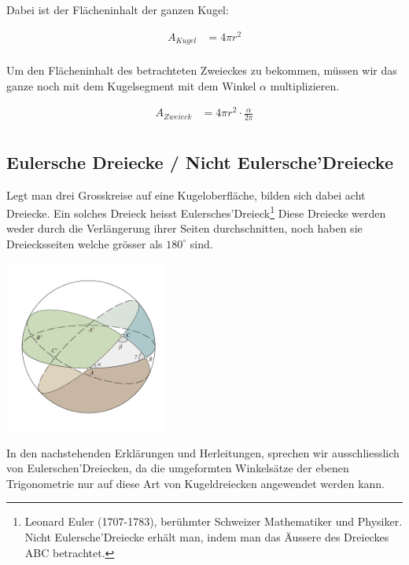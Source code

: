 \begin{refsection}
Dabei ist der Flächeninhalt der ganzen Kugel:

\begin{align*}
A_{ Kugel } &= 4 \pi r^{2}\\
\end{align*}


Um den Flächeninhalt des betrachteten Zweieckes zu bekommen, 
müssen wir das ganze noch mit dem Kugelsegment mit dem Winkel $\alpha$ multiplizieren.

\begin{align*}
A_{ Zweieck } &= 4 \pi r^{2} \cdot \frac{ \alpha }{ 2 \pi }\\
\end{align*}

\subsection{Eulersche Dreiecke / Nicht Eulersche’Dreiecke}

Legt man drei Grosskreise auf eine Kugeloberfläche, bilden sich dabei acht Dreiecke. 
Ein solches Dreieck heisst Eulersches’Dreieck\footnote{%
Leonard Euler (1707-1783), berühmter Schweizer Mathematiker und Physiker. 
Nicht Eulersche’Dreiecke erhält man, indem man das Äussere des Dreieckes ABC betrachtet.} 
Diese Dreiecke werden weder durch die Verlängerung ihrer Seiten durchschnitten, 
noch haben sie Dreiecksseiten welche grösser als $180^{\circ}$ sind.

\begin{center}
        \includegraphics[width=0.4\textwidth]{kugel/Zweiecke.jpg}
\end{center}

In den nachstehenden Erklärungen und Herleitungen, sprechen wir ausschliesslich von Eulerschen’Dreiecken, da die umgeformten Winkelsätze der ebenen Trigonometrie nur auf diese Art von Kugeldreiecken angewendet werden kann.


\end{refsection}
